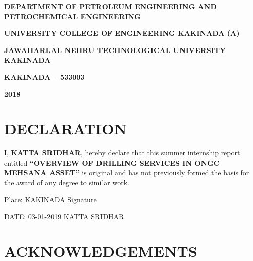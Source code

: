 \documentclass[11pt,a4paper]{report}
\begin{document}
\begin{titlepage}
\begin{center}
\vspace{1em}

\doublespacing

\large \textbf{DEPARTMENT OF PETROLEUM ENGINEERING AND \\
PETROCHEMICAL ENGINEERING}

\vspace{0.5em}

\large \textbf{UNIVERSITY COLLEGE OF ENGINEERING KAKINADA (A)}

\vspace{0.5em}

\large \textbf{JAWAHARLAL NEHRU TECHNOLOGICAL UNIVERSITY KAKINADA}

\vspace{0.5em}

\large \textbf{KAKINADA – 533003}

\vspace{0.5em}

\large \textbf{2018}

\end{center}
\end{titlepage}

\newpage

\section*{\centering DECLARATION}


\vspace{4em}

\doublespacing


I, \textbf{KATTA SRIDHAR}, hereby declare that this summer internship report entitled \textbf{“OVERVIEW OF DRILLING SERVICES IN ONGC MEHSANA ASSET”} is original and has not previously 
formed the basis for the award of any degree to similar work.


\vspace{5em}

\noindent Place: KAKINADA  \hfill Signature     \hspace{0.02\textwidth}

\vspace{1em}

\noindent DATE: 03-01-2019  \hfill KATTA SRIDHAR




\newpage


\section*{\centering ACKNOWLEDGEMENTS}
\end{document}
